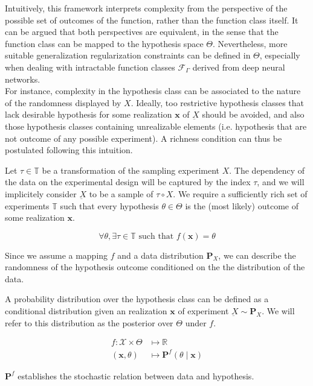 Intuitively, this framework interprets complexity from the perspective of the possible
set of outcomes of the function, rather than the function class itself. It can be argued
that both perspectives are equivalent, in the sense that the function class can be mapped 
to the hypothesis space $\Theta$. Nevertheless, more suitable generalization regularization
constraints can be defined in $\Theta$, especially when dealing with intractable
function classes $\mathcal{F}_{\Gamma}$ derived from deep neural networks. \\

For instance, complexity in the hypothesis class can be associated to the nature of the
randomness displayed by $X$. Ideally, too restrictive hypothesis classes that lack desirable
hypothesis for some realization $\bm{x}$ of $\underbar{X}$ should be avoided, and also those hypothesis
classes containing unrealizable elements (i.e. hypothesis that are not outcome of
any possible experiment). A richness condition can thus be postulated following
this intuition. \\

\begin{definition}
    Let $\tau \in \mathbb{T}$ be a transformation of the sampling experiment $X$. The dependency
    of the data on the experimental design will be captured by the index $\tau$, and we will
    implicitely consider $\underbar{X}$ to be a sample of $\tau \circ X$.  We require a
    sufficiently rich set of experiments $\mathbb{T}$ such that every hypothesis $\theta \in \Theta$
    is the (most likely) outcome of some realization $\bm{x}$.

    $$
    \forall \theta, \exists \tau \in \mathbb{T} \text{ such that } f(\bm{x}) = \theta
    $$
\end{definition}


Since we assume a mapping $f$ and a data distribution $\mathbf{P}_X$, we can describe
the randomness of the hypothesis outcome conditioned on the the distribution of the data.

\begin{definition}[Posterior]
    A probability distribution over the hypothesis class can be defined as a 
    conditional distribution given an realization $\bm{x}$ of experiment $\underbar{X} \sim \mathbf{P}_X$. We will
    refer to this distribution as the posterior over $\Theta$ under $f$.

    $$
        \begin{aligned}
            f: \mathcal{X} \times \Theta & \longmapsto \mathbb{R} \\
            (\bm{x}, \theta) & \longmapsto \mathbf{P}^f (\theta \mid \bm{x})
        \end{aligned}
    $$

    $\mathbf{P}^f$ establishes the stochastic relation between data and hypothesis.
    
\end{definition}

